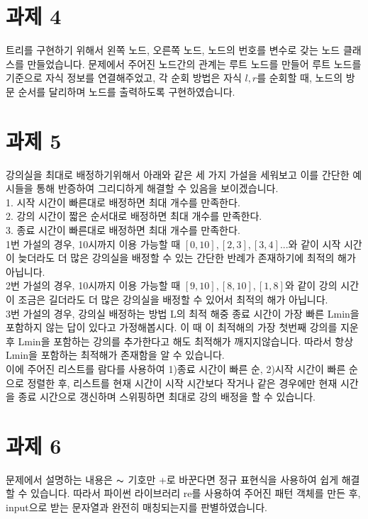 \documentclass{article}
\begin{document}
\section{과제 4}
트리를 구현하기 위해서 왼쪽 노드, 오른쪽 노드, 노드의 번호를 변수로 갖는 노드 클래스를 만들었습니다. 문제에서 주어진 노드간의 관계는 루트 노드를 만들어 루트 노드를 기준으로 자식 정보를 연결해주었고, 각 순회 방법은 자식 $l, r$를 순회할 때, 노드의 방문 순서를 달리하며 노드를 출력하도록 구현하였습니다.

\newpage
\section{과제 5}
강의실을 최대로 배정하기위해서 아래와 같은 세 가지 가설을 세워보고 이를 간단한 예시들을 통해 반증하여 그리디하게 해결할 수 있음을 보이겠습니다.\\
1. 시작 시간이 빠른대로 배정하면 최대 개수를 만족한다.\\
2. 강의 시간이 짧은 순서대로 배정하면 최대 개수를 만족한다.\\
3. 종료 시간이 빠른대로 배정하면 최대 개수를 만족한다.\\
1번 가설의 경우, 10시까지 이용 가능할 때 $[0, 10], [2, 3], [3, 4] ... $와 같이 시작 시간이 늦더라도 더 많은 강의실을 배정할 수 있는 간단한 반례가 존재하기에 최적의 해가 아닙니다.\\
2번 가설의 경우, 10시까지 이용 가능할 때 $[9, 10], [8, 10], [1, 8] $와 같이 강의 시간이 조금은 길더라도 더 많은 강의실을 배정할 수 있어서 최적의 해가 아닙니다.\\
3번 가설의 경우, 강의실 배정하는 방법 L의 최적 해중 종료 시간이 가장 빠른 Lmin을 포함하지 않는 답이 있다고 가정해봅시다. 이 때 이 최적해의 가장 첫번째 강의를 지운 후 Lmin을 포함하는 강의를 추가한다고 해도 최적해가 깨지지않습니다. 따라서 항상 Lmin을 포함하는 최적해가 존재함을 알 수 있습니다.\\
이에 주어진 리스트를 람다를 사용하여 1)종료 시간이 빠른 순, 2)시작 시간이 빠른 순으로 정렬한 후, 리스트를 현재 시간이 시작 시간보다 작거나 같은 경우에만 현재 시간을 종료 시간으로 갱신하며 스위핑하면 최대로 강의 배정을 할 수 있습니다.
 
\section{과제 6}
문제에서 설명하는 내용은 $\thicksim$ 기호만 +로 바꾼다면 정규 표현식을 사용하여 쉽게 해결할 수 있습니다. 따라서 파이썬 라이브러리 re를 사용하여 주어진 패턴 객체를 만든 후, input으로 받는 문자열과 완전히 매칭되는지를 판별하였습니다.
\end{document}
